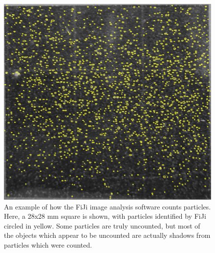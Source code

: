 \documentclass[fleqn,10pt]{SelfArx} %
\begin{document}
	
	\begin{figure}[h]
		\centering
		\includegraphics[width=1\linewidth]{Figures/ParticleCounting}
		\caption[FiJi Particle Counting]{An example of how the FiJi image analysis software counts particles. Here, a 28x28 mm square is shown, with particles identified by FiJi circled in yellow. Some particles are truly uncounted, but most of the objects which appear to be uncounted are actually shadows from particles which were counted.}
		\label{fig:FiJiAnal}
	\end{figure}
	
\end{document}

